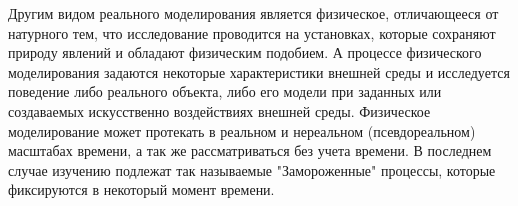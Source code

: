 \documentclass{article}
\begin{document}
    Другим видом реального моделирования является физическое, отличающееся от натурного тем, что исследование проводится на установках, которые сохраняют природу явлений и обладают физическим подобием. А процессе физического моделирования задаются некоторые характеристики внешней среды и исследуется поведение либо реального объекта, либо его модели при заданных или создаваемых искусственно воздействиях внешней среды. Физическое моделирование может протекать в реальном и нереальном (псевдореальном) масштабах времени, а так же рассматриваться без учета времени. В последнем случае изучению подлежат так называемые "Замороженные" процессы, которые фиксируются в некоторый момент времени.


\end{document}

